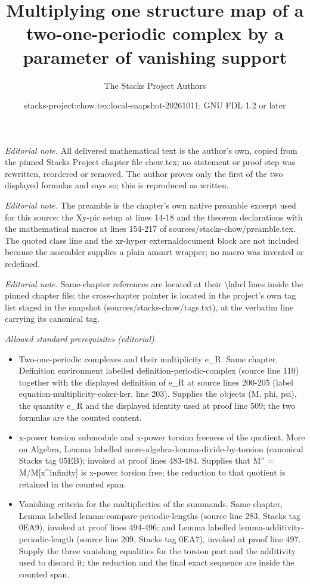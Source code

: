 \documentclass[10pt,a4paper]{amsart}
\title{Multiplying one structure map of a two-one-periodic complex by a parameter of vanishing support}
\author{The Stacks Project Authors}
\date{stacks-project:chow.tex:local-snapshot-20261011; GNU FDL 1.2 or later}
\theoremstyle{plain}
\theoremstyle{definition}
\theoremstyle{remark}
\numberwithin{equation}{subsection}
\begin{document}
\maketitle
\noindent\textit{Editorial note.} All delivered mathematical text is the author's own, copied from the pinned Stacks Project chapter file chow.tex; no statement or proof step was rewritten, reordered or removed. The author proves only the first of the two displayed formulas and says so; this is reproduced as written.\par\medskip
\noindent\textit{Editorial note.} The preamble is the chapter's own native preamble excerpt used for this source: the Xy-pic setup at lines 14-18 and the theorem declarations with the mathematical macros at lines 154-217 of sources/stacks-chow/preamble.tex. The quoted class line and the xr-hyper externaldocument block are not included because the assembler supplies a plain amsart wrapper; no macro was invented or redefined.\par\medskip
\noindent\textit{Editorial note.} Same-chapter references are located at their \textbackslash{}label lines inside the pinned chapter file; the cross-chapter pointer is located in the project's own tag list staged in the snapshot (sources/stacks-chow/tags.txt), at the verbatim line carrying its canonical tag.\par\medskip
\noindent\textit{Allowed standard prerequisites (editorial).}\begin{itemize}
\item Two-one-periodic complexes and their multiplicity e\_R. Same chapter, Definition environment labelled definition-periodic-complex (source line 110) together with the displayed definition of e\_R at source lines 200-205 (label equation-multiplicity-coker-ker, line 203). Supplies the objects (M, phi, psi), the quantity e\_R and the displayed identity used at proof line 509; the two formulas are the counted content.
\item x-power torsion submodule and x-power torsion freeness of the quotient. More on Algebra, Lemma labelled more-algebra-lemma-divide-by-torsion (canonical Stacks tag 05EB); invoked at proof lines 483-484. Supplies that M'' = M/M[x\textasciicircum{}infinity] is x-power torsion free; the reduction to that quotient is retained in the counted span.
\item Vanishing criteria for the multiplicities of the summands. Same chapter, Lemma labelled lemma-compare-periodic-lengths (source line 283, Stacks tag 0EA9), invoked at proof lines 494-496; and Lemma labelled lemma-additivity-periodic-length (source line 209, Stacks tag 0EA7), invoked at proof line 497. Supply the three vanishing equalities for the torsion part and the additivity used to discard it; the reduction and the final exact sequence are inside the counted span.
\end{itemize}\medskip
\end{document}
